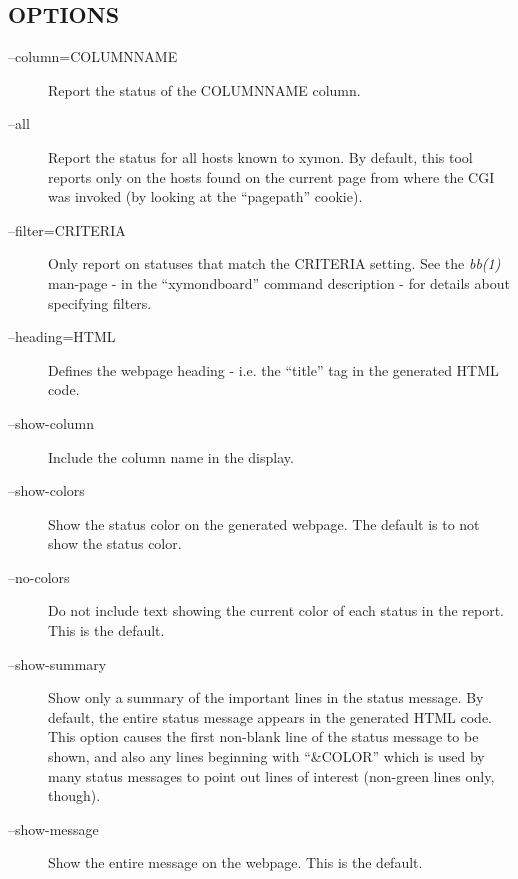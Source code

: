  
\subsection{OPTIONS}
\begin{description}
\item[--column=COLUMNNAME] Report the status of the COLUMNNAME column. 

 

\item[--all] Report the status for all hosts known to xymon. By
  default, this tool reports only on the hosts found on the current
  page from where the CGI was invoked (by looking at the ``pagepath''
  cookie). 


 

\item[--filter=CRITERIA] Only report on statuses that match the
  CRITERIA setting. See the \emph{bb(1)} man-page - in the
  ``xymondboard'' command description - for details about specifying
  filters. 


 

\item[--heading=HTML] Defines the webpage heading - i.e. the ``title'' tag in the generated HTML code. 

 

\item[--show-column] Include the column name in the display. 

 

\item[--show-colors] Show the status color on the generated webpage. The default is to not show the status color. 

 

\item[--no-colors] Do not include text showing the current color of each status in the report. This is the default. 

 

\item[--show-summary] Show only a summary of the important lines in
  the status message. By default, the entire status message appears in
  the generated HTML code. This option causes the first non-blank line
  of the status message to be shown, and also any lines beginning with
  ``\&COLOR'' which is used by many status messages to point out lines
  of interest (non-green lines only, though). 


 

\item[--show-message] Show the entire message on the webpage. This is the default. 


\end{description}
